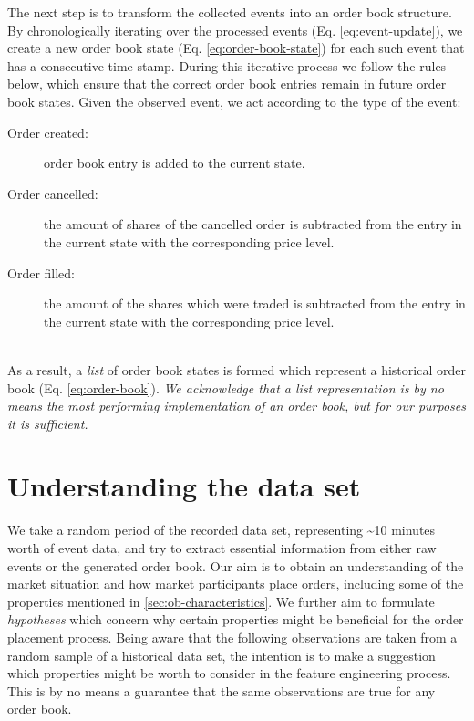 The next step is to transform the collected events into an order book structure.
By chronologically iterating over the processed events (Eq. \ref{eq:event-update}), we create a new order book state (Eq. \ref{eq:order-book-state}) for each such event that has a consecutive time stamp.
During this iterative process we follow the rules below, which ensure that the correct order book entries remain in future order book states.
Given the observed event, we act according to the type of the event:
\begin{description}
    \item[Order created:] order book entry is added to the current state.
    \item[Order cancelled:] the amount of shares of the cancelled order is subtracted from the entry in the current state with the corresponding price level.
    \item[Order filled:] the amount of the shares which were traded is subtracted from the entry in the current state with the corresponding price level.
\end{description}
\hfill
\\
As a result, a \textit{list} of order book states is formed which represent a historical order book (Eq. \ref{eq:order-book}).
\textit{We acknowledge that a list representation is by no means the most performing implementation of an order book, but for our purposes it is sufficient.}

\vfill

\section{Understanding the data set}
\label{sec:data-hypotheses}

We take a random period of the recorded data set, representing \textasciitilde10 minutes worth of event data, and try to extract essential information from either raw events or the generated order book.
Our aim is to obtain an understanding of the market situation and how market participants place orders, including some of the properties mentioned in \ref{sec:ob-characteristics}.
We further aim to formulate \textit{hypotheses} which concern why certain properties might be beneficial for the order placement process.
Being aware that the following observations are taken from a random sample of a historical data set, the intention is to make a suggestion which properties might be worth to consider in the feature engineering process.
This is by no means a guarantee that the same observations are true for any order book.

